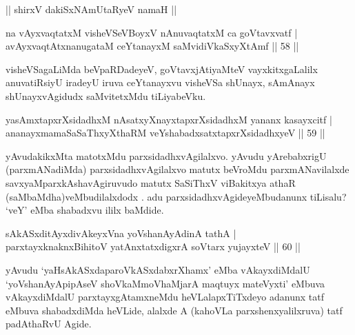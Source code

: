 \begin{center}%
|| shirxV dakiSxNAmUtaRyeV namaH ||
\end{center}

\begin{shl}
na vAyxvaqtatxM visheVSeVBoyxV nAnuvaqtatxM ca goVtavxvatf |\\
avAyxvaqtAtxnanugataM ceYtanayxM saMvidiVkaSxyXtAmf \hfill || 58 ||
\end{shl}

\begin{artha}
visheVSagaLiMda beVpaRDadeyeV, goVtavxjAtiyaMteV vayxkitxgaLalilx anuvatiRsi\-yU iradeyU iruva ceYtanayxvu visheVSa shUnayx, sAmAnayx shUnayxvAgidudx saMvitetxMdu tiLiyabeVku.
\end{artha}


\begin{shl}
yasAmxtapxrXsidadhxM nAsatxyXnayxtapxrXsidadhxM yananx kasayxcitf |\\
ananayxmamaSaSaThxyXthaRM veYshabadxsatxtapxrXsidadhxyeV \hfill || 59 ||
\end{shl}

\begin{artha}
yAvudakikxMta matotxMdu parxsidadhxvAgilalxvo. yAvudu yArebabxrigU \break (parxmANadiMda) parxsidadhxvAgilalxvo matutx beVroMdu parxmANavilalxde savxyaMparxkAsha\-vAgiruvudo matutx SaSiThxV viBakitxya athaR (saMbaMdha)veMbudilalxdodx . adu parxsidadhxvAgideyeMbudanunx tiLisalu? `veY' eMba shabadxvu ililx baMdide.
\end{artha}


\begin{shl}
sAkASxditAyxdivAkeyxVna yoV\s shanAyAdinA tathA |\\
parxtayxknaknxBihitoV yatAnxtatxdigxrA soV\s tarx yujayxteV \hfill || 60 ||
\end{shl}

\begin{artha}
yAvudu `yaHsAkASxdaparoVkASxdabxrXhamx' eMba vAkayxdiMdalU `yoV\s shanA\-yApipAseV shoVkaMmoVhaMjarA maqtuyx mateVyxti' eMbuva vAkayxdiMdalU parxtayxgAtamxneMdu heVLalapxTiTxdeyo adanunx tatf eMbuva shabadxdiMda heVLide, alalxde A (kahoVLa parxshenxyalilxruva) tatf padAthaRvU Agide.
\end{artha}



